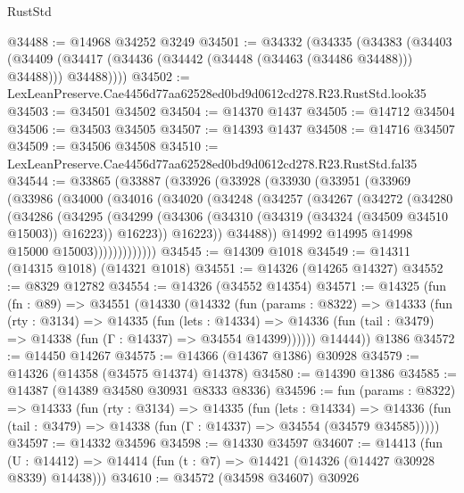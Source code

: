 \begin{lexlean}{RustStd}
\begin{coremodule}
@34488 := @14968 @34252 @3249
@34501 := @34332
    (@34335
      (@34383
        (@34403
          (@34409 (@34417 (@34436 (@34442 (@34448 (@34463 (@34486 @34488))) @34488))) @34488))))
@34502 := LexLeanPreserve.Cae4456d77aa62528ed0bd9d0612cd278.R23.RustStd.look35
@34503 := @34501 @34502
@34504 := @14370 @1437
@34505 := @14712 @34504
@34506 := @34503 @34505
@34507 := @14393 @1437
@34508 := @14716 @34507
@34509 := @34506 @34508
@34510 := LexLeanPreserve.Cae4456d77aa62528ed0bd9d0612cd278.R23.RustStd.fal35
@34544 := @33865
    (@33887
      (@33926
        (@33928
          (@33930
            (@33951
              (@33969
                (@33986
                  (@34000
                    (@34016
                      (@34020
                        (@34248
                          (@34257
                            (@34267
                              (@34272
                                (@34280
                                  (@34286
                                    (@34295
                                      (@34299
                                        (@34306
                                          (@34310 (@34319 (@34324 (@34509 @34510 @15003)) @16223))
                                          @16223))
                                      @16223))
                                  @34488))
                              @14992
                              @14995
                              @14998
                              @15000
                              @15003)))))))))))))
@34545 := @14309 @1018
@34549 := @14311 (@14315 @1018) (@14321 @1018)
@34551 := @14326 (@14265 @14327)
@34552 := @8329 @12782
@34554 := @14326 (@34552 @14354)
@34571 := @14325
    (fun (fn : @89) =>
    @34551
      (@14330
        (@14332
          (fun (params : @8322) =>
          @14333
            (fun (rty : @3134) =>
            @14335
              (fun (lets : @14334) =>
              @14336 (fun (tail : @3479) => @14338 (fun (Γ : @14337) => @34554 @14399))))))
        @14444))
    @1386
@34572 := @14450 @14267
@34575 := @14366 (@14367 @1386) @30928
@34579 := @14326 (@14358 (@34575 @14374) @14378)
@34580 := @14390 @1386
@34585 := @14387 (@14389 @34580 @30931 @8333 @8336)
@34596 := fun (params : @8322) =>
  @14333
    (fun (rty : @3134) =>
    @14335
      (fun (lets : @14334) =>
      @14336 (fun (tail : @3479) => @14338 (fun (Γ : @14337) => @34554 (@34579 @34585)))))
@34597 := @14332 @34596
@34598 := @14330 @34597
@34607 := @14413
    (fun (U : @14412) => @14414 (fun (t : @7) => @14421 (@14326 (@14427 @30928 @8339) @14438)))
@34610 := @34572 (@34598 @34607) @30926

\end{coremodule}
\end{lexlean}
